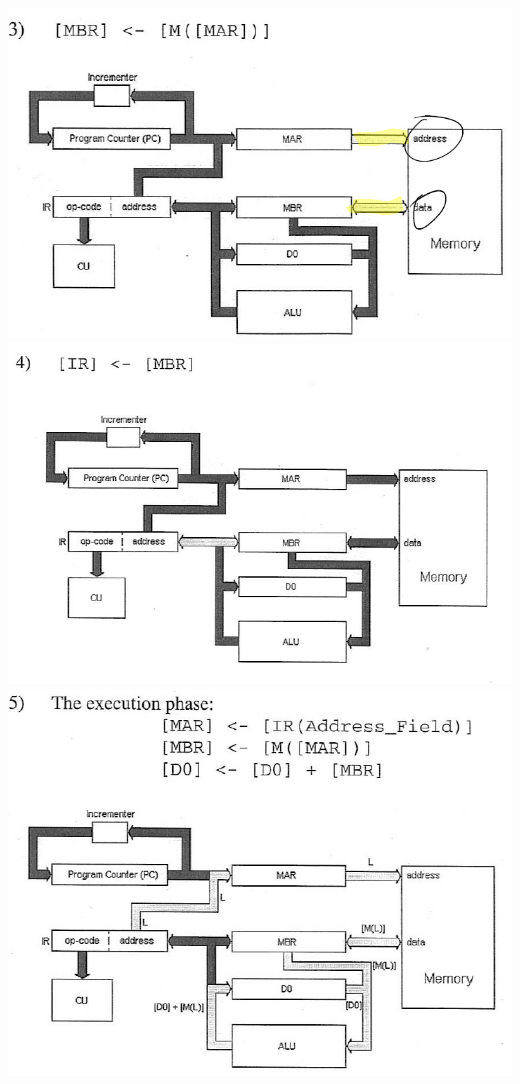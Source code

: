 \documentclass[12 pt]{article}
\begin{document}
		\\\includegraphics[scale=0.7]{mi3}
		\\ \includegraphics[scale=0.7]{mi4}
		\\ \includegraphics[scale=0.7]{mi5}
\end{document}
